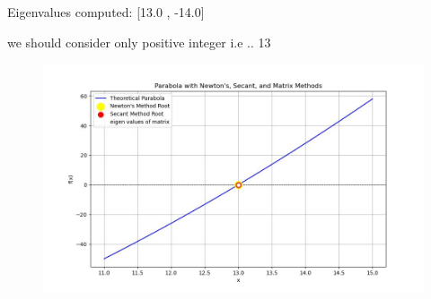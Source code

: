 \documentclass[journal]{IEEEtran}
\begin{document}
Eigenvalues computed: [13.0 , -14.0]

we should consider only positive integer i.e .. 13


\begin{figure}[h!]
   \centering
   \includegraphics[width=\columnwidth]{fig/combined_fig.jpg}
\end{figure}
\end{document}
